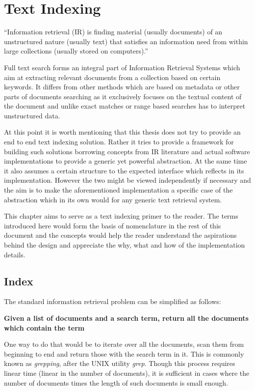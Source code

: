 \chapter{Text Indexing}
\label{chap:textIndexing}

``Information retrieval (IR) is finding material (usually documents) of an unstructured nature (usually text)
that satisfies an information need from within large collections (usually stored on computers).''\cite{IRBook}

Full text search forms an integral part of Information Retrieval Systems which aim at extracting
relevant documents from a collection based on certain keywords.
It differs from other methods which are based on metadata or other parts of documents searching as it exclusively focuses on the
textual content of the document and unlike exact matches or range based searches has to interpret unstructured data.

At this point it is worth mentioning that this thesis does not try to provide an end to end text indexing solution.
Rather it tries to provide a framework for building such solutions borrowing concepts from IR literature and actual software
implementations to provide a generic yet powerful abstraction.
At the same time it also assumes a certain structure to the expected interface which reflects in its implementation.
However the two might be viewed independently if necessary and the aim is to make the aforementioned implementation a specific
case of the abstraction which in its own would for any generic text retrieval system.

This chapter aims to serve as a text indexing primer to the reader.
The terms introduced here would form the basis of nomenclature in the rest of this document and
the concepts would help the reader understand the aspirations behind the design and appreciate the why, what and how
of the implementation details.

\section{Index}
The standard information retrieval problem can be simplified as follows:

\noindent \textbf{Given a list of documents and a search term, return all the documents which contain the term}

One way to do that would be to iterate over all the documents, scan them from beginning to end and return those with the search term in it.
This is commonly known as \textit{grepping}, after the UNIX utility \textit{grep}.
Though this process requires linear time (linear in the number of documents),
it is sufficient in cases where the number of documents times the length of such documents is small enough.

